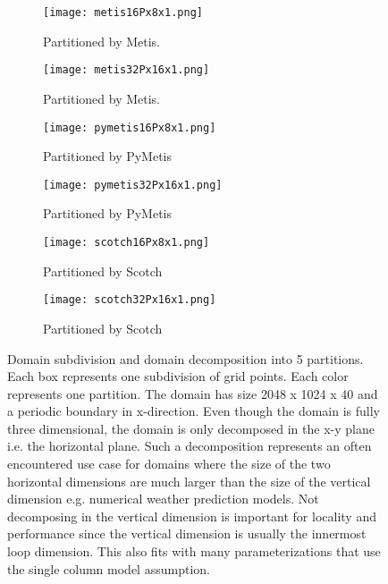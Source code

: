 \begin{figure}[!htbp]
\centering
\begin{subfigure}{0.5\textwidth}
  \centering
  \texttt{[image: metis16Px8x1.png]}
  \caption{Partitioned by Metis.}
  \label{fig:metis1}
\end{subfigure}%
\begin{subfigure}{0.5\textwidth}
  \centering
  \texttt{[image: metis32Px16x1.png]}
  \caption{Partitioned by Metis.}
  \label{fig:metis2}
\end{subfigure}

\begin{subfigure}{0.5\textwidth}
  \centering
  \texttt{[image: pymetis16Px8x1.png]}
  \caption{Partitioned by PyMetis}
  \label{fig:pymetis1}
\end{subfigure}%
\begin{subfigure}{0.5\textwidth}
  \centering
  \texttt{[image: pymetis32Px16x1.png]}
  \caption{Partitioned by PyMetis}
  \label{fig:pymetis2}
\end{subfigure}

\begin{subfigure}{0.5\textwidth}
  \centering
  \texttt{[image: scotch16Px8x1.png]}
  \caption{Partitioned by Scotch}
  \label{fig:scotch1}
\end{subfigure}%
\begin{subfigure}{0.5\textwidth}
  \centering
  \texttt{[image: scotch32Px16x1.png]}
  \caption{Partitioned by Scotch}
  \label{fig:scotch2}
\end{subfigure}

\caption{Domain subdivision and domain decomposition into 5 partitions. 
Each box represents one subdivision of grid points.
Each color represents one partition. 
The domain has size 2048 x 1024 x 40 and a periodic boundary in x-direction.
Even though the domain is fully three dimensional, the domain is only decomposed in the x-y plane i.e. the horizontal plane.
Such a decomposition represents an often encountered use case for domains where the size of the two horizontal dimensions are much larger than the size of the vertical dimension e.g. numerical weather prediction models.
Not decomposing in the vertical dimension is important for locality and performance since the vertical dimension is usually the innermost loop dimension.
This also fits with many parameterizations that use the single column model assumption.
}
\label{fig:rectangular1}
\end{figure}

